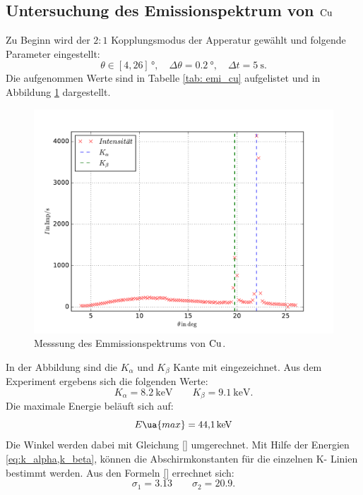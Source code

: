 \subsection{Untersuchung des Emissionspektrum von $\ce{Cu}$}
Zu Beginn wird der $2:1$ Kopplungsmodus der Apperatur gewählt und folgende Parameter eingestellt:
\begin{equation*}
  \theta\in\left[4,26\right]\,\si{\degree},\quad \Delta\theta=\SI{0.2}{\degree}, \quad \Delta t=\SI{5}{\second}.
\end{equation*}
Die aufgenommen Werte sind in Tabelle \ref{tab: emi_cu} aufgelistet und in Abbildung \ref{fig: emission_cu} dargestellt.

\begin{figure}
  \centering
  \includegraphics[width=0.8 \textwidth]{../Messdaten/emission_cu.pdf}
  \caption{Messsung des Emmissionspektrums von $\ce{Cu}$.} %
  \label{fig: emission_cu}
\end{figure}
In der Abbildung sind die $K_\alpha$ und $K_\beta$ Kante mit eingezeichnet.
Aus dem Experiment ergebens sich die folgenden Werte:
\begin{equation}
  \label{eq:k_alpha,k_beta}
  K_\alpha=\SI{8.2}{\kilo\eV} \qquad   K_\beta=\SI{9.1}{\kilo\eV}.
\end{equation}
Die maximale Energie beläuft sich auf:
\begin{equation}
  \label{eq: maximale_energie}
  E\ua{max}=\SI{44.1}{\kilo\eV}
\end{equation}
Die Winkel werden dabei mit Gleichung \eqref{} umgerechnet.
Mit Hilfe der Energien \eqref{eq:k_alpha,k_beta}, können die Abschirmkonstanten
für die einzelnen K- Linien bestimmt werden.
Aus den Formeln \eqref{} errechnet sich:
\begin{equation}
   \label{eq:abschirm}
   \sigma_1=3.13 \qquad \sigma_2=20.9.
\end{equation}

